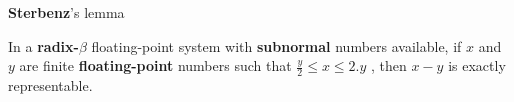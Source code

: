 \begin{frame}{\textbf{Sterbenz}’s lemma}
   \begin{lem}
In a \textbf{radix-$\beta$} floating-point system with \textbf{subnormal} numbers available, if $x$ and $y$ are finite \textbf{floating-point} numbers such that
$\frac{y}{2} \le x \le 2.y$ , then $x - y$ is exactly representable.
\end{lem} 
\end{frame}
